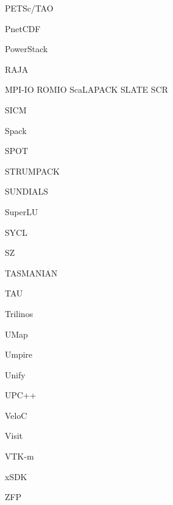 PETSc/TAO

PnetCDF

PowerStack

RAJA

MPI-IO
ROMIO
ScaLAPACK
SLATE
SCR

SICM

Spack

SPOT

STRUMPACK

SUNDIALS

SuperLU

SYCL

SZ

TASMANIAN

TAU

Trilinos

UMap

Umpire

Unify

UPC++

VeloC

Visit

VTK-m

xSDK

ZFP


